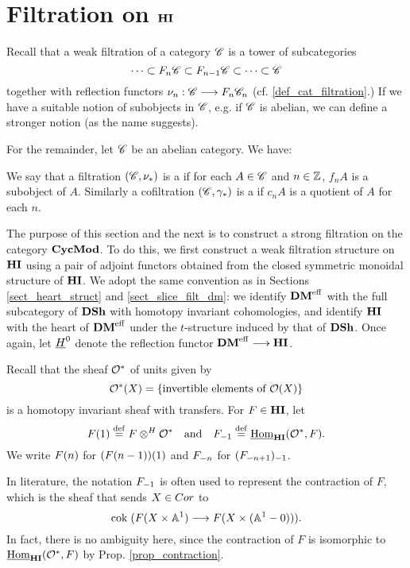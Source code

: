 \newpage
\section{Filtration on $\HI$}\label{sect_filtration_hi}

Recall that a weak filtration of a category $\Cat{C}$ is a tower 
of subcategories
\[
\cdots \subset F_n\Cat{C} \subset F_{n - 1}\Cat{C} \subset \cdots 
   \subset \Cat{C}
\]
together with reflection functors $\nu_n : \Cat{C} \to F_n\Cat{C}_n$
(cf. \ref{def_cat_filtration}.) If we have a suitable notion of
subobjects in $\Cat{C}$, e.g. if $\Cat{C}$ is abelian, we can 
define a stronger notion (as the name suggests).

For the remainder, let $\Cat{C}$ be an abelian category. We have:

\begin{defn}
We say that a filtration $(\Cat{C}, \nu_*)$ is a  if for each $A \in \Cat{C}$ and $n \in \Z$, $f_n A$ is 
a subobject of $A$. Similarly a cofiltration $(\Cat{C}, \gamma_*)$ 
is a  if $c_n A$ is a quotient of $A$ for 
each $n$.
\end{defn}

The purpose of this section and the next is to construct a 
strong filtration on the category $\CycMod$. To do this, we first
construct a weak filtration structure on $\HI$ using a pair
of adjoint functors obtained from the closed symmetric monoidal 
structure of $\HI$. We adopt the same convention as in Sections
\ref{sect_heart_struct} and \ref{sect_slice_filt_dm}: we identify 
$\DMeff$ with the full subcategory of $\DSh$ with homotopy 
invariant cohomologies, and identify $\HI$ with the heart of 
$\DMeff$ under the $t$-structure induced by that of $\DSh$. Once
again, let $\sheaf{H}^0$ denote the reflection functor $\DMeff
\to \HI$.

Recall that the sheaf $\Ox$ of units given by 
\[
\Ox(X) = \{\textrm{invertible elements of }\O(X)\}
\]
is a homotopy invariant sheaf with transfers. For $F \in \HI$, 
let
\[
\LHI{F} \defeq F \tHI \Ox \hspace{10pt} \textrm{and}\hspace{10pt} 
   \RHI{F} \defeq \ihomHI(\Ox, F).  
\]
We write $\LHI[n]{F}$ for $\LHI{(\LHI[n - 1]{F})}$ and 
$\RHI[n]{F}$ for $\RHI{(\RHI[n + 1]{F})}$.

\begin{rmk}\label{rmk_contract_rhi_eq}
In literature, the notation $\RHI{F}$ is often used to represent
the contraction of $F$, which is the sheaf that sends $X \in 
\Cor$ to 
\[
\cok( F(X \times \A^1) \to F(X \times (\A^1 - 0))).
\]
In fact, there is no ambiguity here, since the contraction of
$F$ is isomorphic to $\ihomHI(\Ox, F)$ by Prop. 
\ref{prop_contraction}.
\end{rmk}

